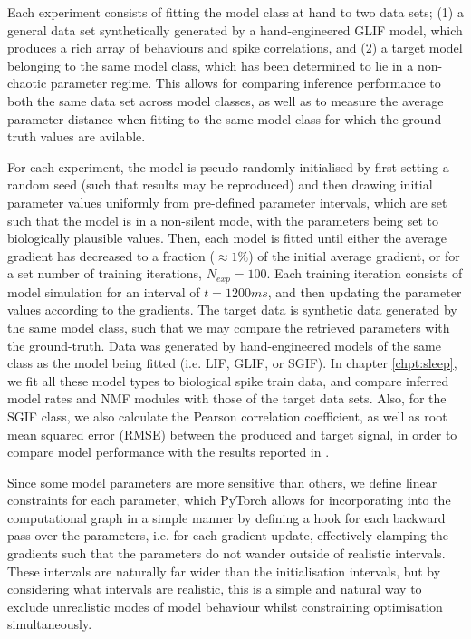 \documentclass[mphil,deptreport,ianc]{infthesis} %
\begin{document}
Each experiment consists of fitting the model class at hand to two data sets; (1) a general data set synthetically generated by a hand-engineered GLIF model, which produces a rich array of behaviours and spike correlations, and (2) a target model belonging to the same model class, which has been determined to lie in a non-chaotic parameter regime.
This allows for comparing inference performance to both the same data set across model classes, as well as to measure the average parameter distance when fitting to the same model class for which the ground truth values are avilable.


For each experiment, the model is pseudo-randomly initialised by first setting a random seed (such that results may be reproduced) and then drawing initial parameter values uniformly from pre-defined parameter intervals, which are set such that the model is in a non-silent mode, with the parameters being set to biologically plausible values.
Then, each model is fitted until either the average gradient has decreased to a fraction ($\approx 1 \%$) of the initial average gradient, or for a set number of training iterations, $N_{exp}=100$.
Each training iteration consists of model simulation for an interval of $t=1200 \si{ms}$, and then updating the parameter values according to the gradients.
The target data is synthetic data generated by the same model class, such that we may compare the retrieved parameters with the ground-truth.
Data was generated by hand-engineered models of the same class as the model being fitted (i.e. LIF, GLIF, or SGIF).
In chapter \ref{chpt:sleep}, we fit all these model types to biological spike train data, and compare inferred model rates and NMF modules with those of the target data sets.
Also, for the SGIF class, we also calculate the Pearson correlation coefficient, as well as root mean squared error (RMSE) between the produced and target signal, in order to compare model performance with the results reported in \cite{Rene2020}.

Since some model parameters are more sensitive than others, we define linear constraints for each parameter, which PyTorch allows for incorporating into the computational graph in a simple manner by defining a hook for each backward pass over the parameters, i.e. for each gradient update, effectively clamping the gradients such that the parameters do not wander outside of realistic intervals. These intervals are naturally far wider than the initialisation intervals, but by considering what intervals are realistic, this is a simple and natural way to exclude unrealistic modes of model behaviour whilst constraining optimisation simultaneously.
\end{document}
